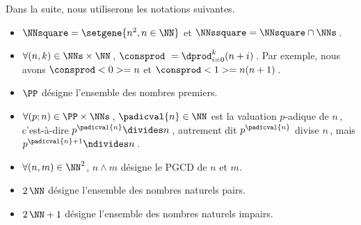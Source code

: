 Dans la suite, nous utiliserons les notations suivantes.
\begin{itemize}
	\item $\NNsquare = \setgene{n^2, n \in \NN}$
	      et
	      $\NNssquare = \NNsquare \cap \NNs$\,.

	\item $\forall (n, k) \in \NNs \times \NN$\,, $\consprod\ = \dprod_{i = 0}^{k} (n + i)$\,. 
	Par exemple, nous avons $\consprod<0> = n$ et $\consprod<1> = n(n+1)$\,.

	\item $\PP$ désigne l'ensemble des nombres premiers.
	
	\item $\forall (p ; n) \in \PP \times \NNs$\,, $\padicval{n} \in \NN$ est la valuation $p$-adique de $n$\,, c'est-à-dire $p^{\padicval{n}} \divides n$\,, autrement dit $p^{\padicval{n}}$ divise $n$\,, mais $p^{\padicval{n} + 1} \ndivides n$\,.

	\item $\forall (n , m) \in \NN^2$, $n \wedge m$ désigne le PGCD de $n$ et $m$.
	
	\item $2\,\NN$ désigne l'ensemble des nombres naturels pairs.
	
	\item $2\,\NN + 1$ désigne l'ensemble des nombres naturels impairs.
\end{itemize}